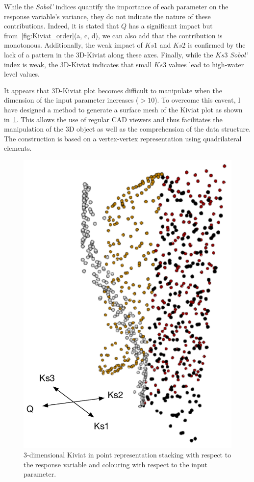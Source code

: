 While the \emph{Sobol'} indices quantify the importance of each parameter on the response variable's variance, they do not indicate the nature of these contributions. Indeed, it is stated that $Q$ has a significant impact but from~\cref{fig:Kiviat_order}(a, c, d), we can also add that the contribution is monotonous. Additionally, the weak impact of $Ks1$ and $Ks2$ is confirmed by the lack of a pattern in the 3D-Kiviat along these axes. Finally, while the $Ks3$ \emph{Sobol'} index is weak, the 3D-Kiviat indicates that small $Ks3$ values lead to high-water level values.

It appears that 3D-Kiviat plot becomes difficult to manipulate when the dimension of the input parameter increases ($>10$). To overcome this caveat, I have designed a method to generate a surface mesh of the Kiviat plot as shown in~\cref{fig:mesh}. This allows the use of regular CAD viewers and thus facilitates the manipulation of the 3D object as well as the comprehension of the data structure. The construction is based on a vertex-vertex representation using quadrilateral elements. %

\begin{figure}[!ht]
\centering
\includegraphics[width=0.6\linewidth,keepaspectratio]{fig/contributions/visu/mascaret_mesh_points.pdf}
\caption{3-dimensional Kiviat in point representation stacking with respect to the response variable and colouring with respect to the input parameter.}%
\label{fig:mesh}
\end{figure}

